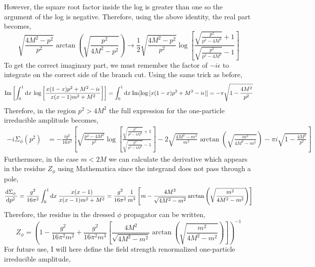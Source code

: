 \documentclass{article}
\begin{document}
However, the square root factor inside the log is greater than one so the argument of the log is negative. Therefore, using the above identity, the real part becomes,
\[\sqrt{\frac{4 M^2 - p^2}{p^2}} \arctan{\left(\sqrt{\frac{p^2}{4 M^2 - p^2}}\right)} \to \frac{1}{2} \sqrt{\frac{4 M^2 - p^2}{p^2}} \log{\left[ \frac{\sqrt{\frac{p^2}{p^2 - 4 M^2}} + 1}{\sqrt{\frac{p^2}{p^2 - 4 M^2}} - 1} \right]}\]
To get the correct imaginary part, we must remember the factor of $-i \epsilon$ to integrate on the correct side of the branch cut. Using the same trick as before,  
\[ \mathrm{Im} \left[ \int_{0}^{1} \mathrm{d}x \: \log{\left[\frac{x(1 - x) p^2 + M^2 - i \epsilon}{x(x - 1) m^2 + M^2} \right]} \right]  = \int_{0}^{1} \mathrm{d}x \: \mathrm{Im}[\log{[x(1 - x) p^2 + M^2 - i \epsilon]}] = - \pi \sqrt{1 - \frac{4 M^2}{p^2}} \]
Therefore, in the region $p^2 > 4 M^2$ the full expression for the one-particle irreducible amplitude becomes,
\begin{align*}
- i \Sigma_\phi(p^2) 
& = - \frac{ig^2}{16 \pi^2} \left[ \sqrt{\frac{p^2 - 4 M^2}{p^2}} \log{\left[ \frac{\sqrt{\frac{p^2}{p^2 - 4 M^2}} + 1}{\sqrt{\frac{p^2}{p^2 - 4 M^2}} - 1} \right]} - 2 \sqrt{\frac{4 M^2 - m^2}{m^2}} \arctan{\left(\sqrt{\frac{m^2}{4 M^2 - m^2}}\right)} - \pi i \sqrt{1 - \frac{4 M^2}{p^2}} \right]
\end{align*}
Furthermore, in the case $m < 2M$ we can calculate the derivative which appears in the residue $Z_\phi$ using Mathematica since the integrand does not pass through a pole,
\[ \frac{\mathrm{d}\Sigma_\phi \:}{\mathrm{d}p^2 \:} = \frac{g^2}{16 \pi^2} \int_{0}^1 \mathrm{d}x \: \frac{x(x-1)}{x(x-1)m^2 + M^2} 
=
\frac{g^2}{16 \pi^2} \frac{1}{m^3} \left[ m - \frac{4 M^2}{\sqrt{4 M^2 - m^2}} \arctan{\left( \sqrt{\frac{m^2}{4 M^2 - m^2}} \right)} \right] \]
Therefore, the residue in the dressed $\phi$ propagator can be written,
\[ Z_\phi = \left( 1 - \frac{g^2}{16 \pi^2 m^2} + \frac{g^2}{16 \pi^2 m^3} \left[ \frac{4 M^2}{\sqrt{4 M^2 - m^2}} \arctan{\left( \sqrt{\frac{m^2}{4 M^2 - m^2}} \right)} \right]  \right)^{-1} \]
For future use, I will here define the field strength renormalized one-particle irreducible amplitude,
\end{document}
